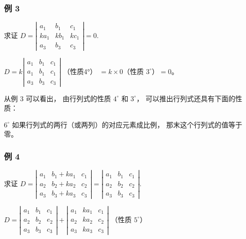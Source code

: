 \subsubsection{例 3}

求证
\(D = \left| \begin{array}{ccc}a_{1} & b_{1} & c_{1}\\ ka_{1} & kb_{1} & kc_{1}\\ a_{3} & b_{3} & c_{3} \end{array} \right| = 0.\)

\(D=k\left|\begin{matrix}a_{1}&b_{1}&c_{1}\\a_{1}&b_{1}&c_{1}\\a_{3}&b_{3}&c_{3}\end{matrix}\right|\)
（性质4°） \(=k\times0\)（性质 \(3^\circ\)）\(=0\)。

从例 3 可以看出， 由行列式的性质 \(4^{\circ}\) 和 \(3^{\circ}\)，
可以推出行列式还具有下面的性质：

\(6^{\circ}\) 如果行列式的两行（或两列）的对应元素成比例，
那末这个行列式的值等于零。

\subsubsection{例 4}

求证
\(D = \left| \begin{array}{lll}a_{1} & b_{1} + ka_{1} & c_{1}\\ a_{2} & b_{2} + ka_{2} & c_{2}\\ a_{3} & b_{3} + ka_{3} & c_{3} \end{array} \right| = \left| \begin{array}{lll}a_{1} & b_{1} & c_{1}\\ a_{2} & b_{2} & c_{2}\\ a_{3} & b_{3} & c_{3} \end{array} \right|.\)

\(D = \left| \begin{array}{lll}a_{1} & b_{1} & c_{1}\\ a_{2} & b_{2} & e_{2}\\ a_{3} & b_{3} & c_{3} \end{array} \right| + \left| \begin{array}{lll}a_{1} & ka_{1} & c_{1}\\ a_{2} & ka_{2} & c_{2}\\ a_{3} & ka_{3} & c_{3} \end{array} \right|\)
（性质 \(5^{\circ}\)）

